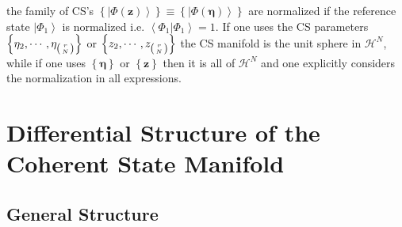 \documentclass[aps,preprint]{revtex4}%
\begin{document}
the family of CS's $\left\{  \left\vert \Phi\left(  \mathbf{z}\right)
\right\rangle \right\}  \equiv\left\{  \left\vert \Phi\left(  \mathbf{\eta
}\right)  \right\rangle \right\}  $ are normalized if the reference state
$\left\vert \Phi_{1}\right\rangle $ is normalized i.e. $\left\langle \left.
\Phi_{1}\right\vert \Phi_{1}\right\rangle =1.$ If one uses the CS parameters
$\left\{  \eta_{2},\cdots,\eta_{\left(
\genfrac{}{}{0pt}{}{r}{N}%
\right)  }\right\}  $ or $\left\{  z_{2},\cdots,z_{\left(
\genfrac{}{}{0pt}{}{r}{N}%
\right)  }\right\}  $ the CS manifold is the unit sphere in $\mathcal{H}^{N}$,
while if one uses $\left\{  \mathbf{\eta}\right\}  $ or $\left\{
\mathbf{z}\right\}  $ then it is all of $\mathcal{H}^{N}$ and one explicitly
considers the normalization in all expressions.

\section{Differential Structure of the Coherent State
Manifold\label{diffstruct}}

\subsection{General Structure}
\end{document}
